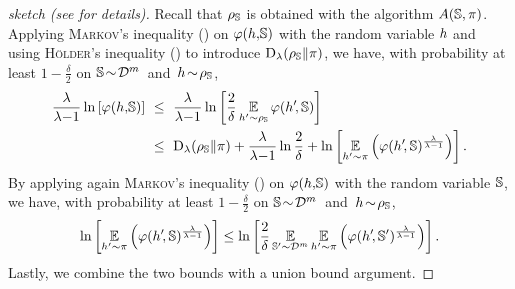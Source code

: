 \begin{noaddcontents}\begin{proof}[sketch (see  for details)]
Recall that $\AQ$ is obtained 
with the algorithm $A(\S, \P)$.
Applying \textsc{Markov}'s inequality () on $\varphi(\h,\!\S)$ with the random variable $\h$ and using \textsc{Hölder}'s inequality () to introduce $\Renyi_{\lambda}(\AQ\|\P)$, we have,  with  probability at least $1{-}\tfrac\delta2$ on \mbox{$\S\!\sim\! \D^\m$ and $\h\!\sim\!\AQ$}, 
\begin{align*}
   \frac{\lambda}{\lambda{-}1}\ln\left[\varphi(\h,\!\S)\right] \ &\le\ \frac{\lambda}{\lambda{-}1}\ln\left[\frac{2}{\delta}\EE_{\h'{\sim} \AQ}\varphi(\h'\!, \S)\right]\\   
   &\le\  \Renyi_{\lambda}(\AQ\|\P)  + \frac{\lambda}{\lambda{-}1}\ln\frac{2}{\delta} +\ln\left[\EE_{\h'{\sim}\P}\LP\varphi(\h'\!, \S)^{\frac{\lambda}{\lambda-1}}\RP\right].
\end{align*}
By applying again \textsc{Markov}'s inequality () on $\varphi(\h,\!\S)$ with the random variable $\S$, we have, with probability at least $1{-}\tfrac\delta2$ on \mbox{$\S\!\sim\! \D^\m$ and $\h\!\sim\!\AQ$},
\begin{align*}
\ln \left[\EE_{\h'{\sim}\P}
\LP\varphi(\h'\!, \S)^{\frac{\lambda}{\lambda{-}1}}\RP\right]
\le 
\ln\left[\frac{2}{\delta}\EE_{\S'{\sim}\D^{\m}}\EE_{\h'{\sim}\P}\LP\varphi(\h'\!, \S')^{\frac{\lambda}{\lambda{-}1}}\RP\right].
\end{align*}
Lastly, we combine the two bounds with a union bound argument.
\end{proof}\end{noaddcontents}

